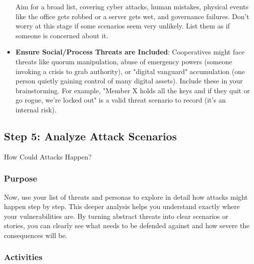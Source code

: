 \begin{itemize}
    Aim for a broad list, covering cyber attacks, human mistakes, physical events
    like the office gets robbed or a server gets wet, and governance failures. Don't
    worry at this stage if some scenarios seem very unlikely. List them as if someone
    is concerned about it.

    \item \textbf{Ensure Social/Process Threats are Included}:
    Cooperatives might face threats like quorum manipulation, abuse of emergency powers
    (someone invoking a crisis to grab authority), or "digital vanguard" accumulation (one person
    quietly gaining control of many digital assets). Include these in
    your brainstorming. For example, "Member X holds all the keys and if they quit
    or go rogue, we're locked out" is a valid threat scenario to record (it's an
    internal risk).

\end{itemize}

\subsection{Step 5: Analyze Attack Scenarios}
\label{subsec:Step5}

How Could Attacks Happen?

\subsubsection{Purpose}

Now, use your list of threats and personas to explore in detail how attacks
might happen step by step. This deeper analysis helps you understand exactly
where your vulnerabilities are. By turning abstract threats into clear scenarios
or stories, you can clearly see what needs to be defended against and how severe
the consequences will be.

\subsubsection{Activities}


